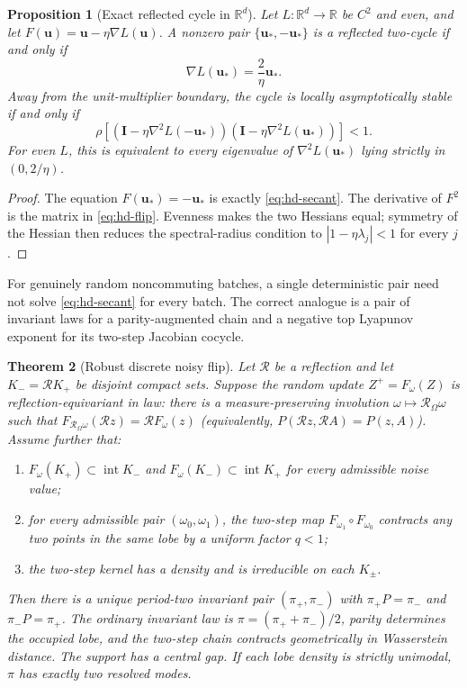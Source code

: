 \documentclass[10pt]{article}
\newtheorem{theorem}{Theorem}[section]
\newtheorem{proposition}[theorem]{Proposition}
\theoremstyle{definition}
\theoremstyle{remark}
\newcommand{\R}{\mathbb R}
\newcommand{\Id}{\mathbf I}
\newcommand{\uvec}{\mathbf u}
\begin{document}
\begin{proposition}[Exact reflected cycle in $\R^d$]
\label{prop:hd-cycle}
Let $L:\R^d\to\R$ be $C^2$ and even, and let
$F(\uvec)=\uvec-\eta\nabla L(\uvec)$.  A nonzero pair
$\{\uvec_*,-\uvec_*\}$ is a reflected two-cycle if and only if
\begin{equation}
 \nabla L(\uvec_*)=\frac{2}{\eta}\uvec_*.
 \label{eq:hd-secant}
\end{equation}
Away from the unit-multiplier boundary, the cycle is locally asymptotically
stable if and only if
\begin{equation}
 \rho\!\left[
 (\Id-\eta\nabla^2L(-\uvec_*))
 (\Id-\eta\nabla^2L(\uvec_*))
 \right]<1.
 \label{eq:hd-flip}
\end{equation}
For even $L$, this is equivalent to every eigenvalue of
$\nabla^2L(\uvec_*)$ lying strictly in $(0,2/\eta)$.
\end{proposition}

\begin{proof}
The equation $F(\uvec_*)=-\uvec_*$ is exactly
\eqref{eq:hd-secant}.  The derivative of $F^2$ is the matrix in
\eqref{eq:hd-flip}.  Evenness makes the two Hessians equal; symmetry of the
Hessian then reduces the spectral-radius condition to
$|1-\eta\lambda_j|<1$ for every $j$.
\end{proof}

For genuinely random noncommuting batches, a single deterministic pair need
not solve \eqref{eq:hd-secant} for every batch.  The correct analogue is a
pair of invariant laws for a parity-augmented chain and a negative top
Lyapunov exponent for its two-step Jacobian cocycle.

\begin{theorem}[Robust discrete noisy flip]
\label{thm:robust-flip}
Let $\mathcal R$ be a reflection and let
$K_-=\mathcal R K_+$ be disjoint compact sets.  Suppose the random update
$Z^+=F_\omega(Z)$ is reflection-equivariant in law: there is a
measure-preserving involution $\omega\mapsto\mathcal R_\Omega\omega$ such that
$F_{\mathcal R_\Omega\omega}(\mathcal R z)=\mathcal R F_\omega(z)$
(equivalently, $P(\mathcal Rz,\mathcal RA)=P(z,A)$).  Assume further that:
\begin{enumerate}[label=(\roman*)]
\item $F_\omega(K_+)\subset\operatorname{int}K_-$ and
      $F_\omega(K_-)\subset\operatorname{int}K_+$ for every admissible
      noise value;
\item for every admissible pair $(\omega_0,\omega_1)$, the two-step map
      $F_{\omega_1}\circ F_{\omega_0}$ contracts any two points in the same
      lobe by a uniform factor $q<1$;
\item the two-step kernel has a density and is irreducible on each $K_\pm$.
\end{enumerate}
Then there is a unique period-two invariant pair
$(\pi_+,\pi_-)$ with $\pi_+P=\pi_-$ and $\pi_-P=\pi_+$.
The ordinary invariant law is
$\pi=(\pi_++\pi_-)/2$, parity determines the occupied lobe, and the two-step
chain contracts geometrically in Wasserstein distance.  The support has a
central gap.  If each lobe density is strictly unimodal, $\pi$ has exactly
two resolved modes.
\end{theorem}
\end{document}
